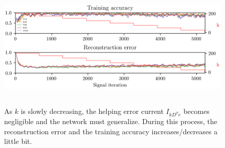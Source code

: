 \documentclass[twoside,11pt,titlepage]{article}
\begin{document}
\begin{figure}[!htb]
  \includegraphics[width = \columnwidth, height=6cm]{figures/figure6.png}
  \caption{As $k$ is slowly decreasing, the helping error current $I_{kD^Te}$ becomes negligible and the network must generalize. During this process, the
  reconstruction error and the training accuracy increases/decreases a little bit. }
  \label{fig:figure6}
\end{figure}
\end{document}
